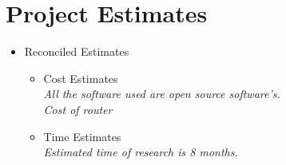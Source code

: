 \documentclass[12pt,a4paper]{report}
\begin{document}
\section{Project Estimates}
\begin{itemize}
\item Reconciled Estimates
 	     \begin{itemize}
 	      	\item Cost Estimates
				\textit{\\All the software used are open 						source software’s.} \\
			\textit{Cost of router}	
		   
     		\item Time Estimates
				\textit{\\Estimated time of research is 8 months.}
		\end{itemize} 
			

\end{itemize}
\end{document}
